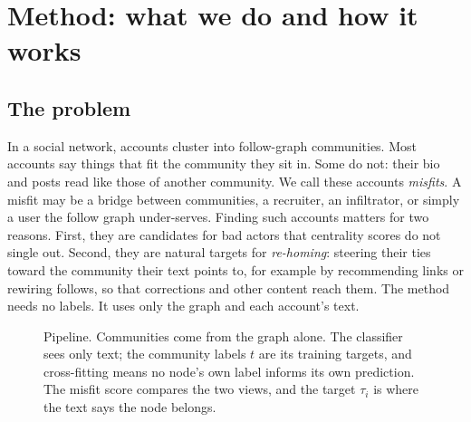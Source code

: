 \providecommand{\pc}{p_C}

\section{Method: what we do and how it works}
\label{sec:method}

\subsection{The problem}
In a social network, accounts cluster into follow-graph communities. Most accounts say things that fit the community they sit in. Some do not: their bio and posts read like those of another community. We call these accounts \emph{misfits}. A misfit may be a bridge between communities, a recruiter, an infiltrator, or simply a user the follow graph under-serves. Finding such accounts matters for two reasons. First, they are candidates for bad actors that centrality scores do not single out. Second, they are natural targets for \emph{re-homing}: steering their ties toward the community their text points to, for example by recommending links or rewiring follows, so that corrections and other content reach them. The method needs no labels. It uses only the graph and each account's text.

\begin{figure}[htbp]
\centering
{}
\caption{Pipeline. Communities come from the graph alone. The classifier sees only text; the community labels $t$ are its training targets, and cross-fitting means no node's own label informs its own prediction. The misfit score compares the two views, and the target $\tau_i$ is where the text says the node belongs.}
\label{fig:pipeline}
\end{figure}

